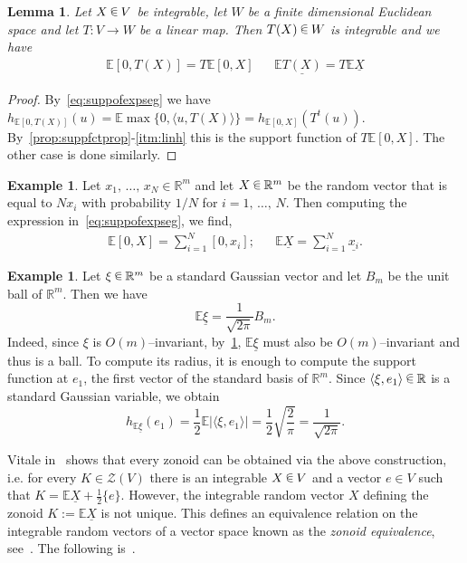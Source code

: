 \documentclass[10pt]{amsart}
\newtheorem{lemm}[theo]{Lemma}\newtheorem{prop}[theo]{Proposition}\newtheorem{coro}[theo]{Corollary}\newtheorem{conj}[theo]{Conjecture}
\theoremstyle{definition}\newtheorem{defi}[theo]{Definition}\newtheorem{rema}[theo]{Remark}\newtheorem{exam}[theo]{Example}\newtheorem{exem}[theo]{Example}\newtheorem{nota}[theo]{Notation}
\newcommand{\R}{\mathbb{R}}
\newcommand{\EE}{\mathbb{E}}
\newcommand{\ZZ}{\mathscr{Z}}
\newcommand{\seg}{\underline}
\newcommand*\randin{
\mathchoice {\raisebox{-.35ex}{$\displaystyle{^\subset}$}\mkern-11.5mu\raisebox{+.45ex}{$\displaystyle{_\subset}$}} {\mkern+1mu\raisebox{-.27ex}{$\textstyle{^\subset}$}\mkern-11.7mu\raisebox{+.45ex}{$\textstyle{_\subset}$}} {\raisebox{.35ex}{$\scriptstyle\subset$}\mkern-14mu\raisebox{-.15ex}{$\scriptstyle\subset$}} {\raisebox{.3ex}{$\scriptscriptstyle\subset$}\mkern-13.5mu\raisebox{-.10ex}{$\scriptscriptstyle\subset$}}}
\begin{document}
\begin{lemm}\label{lem:lineartransfofVitale}
Let $X\,\randin\, V$ be integrable, let $W$ be a finite dimensional Euclidean space and let $T:V\to W$ be a linear map. Then $T(X)\,\randin\, W$ is integrable and we have
\begin{align*}
\EE[0,T(X)]=T\EE[0,X] && \EE\seg{T(X)}=T\EE\seg{X}
\end{align*}
\end{lemm}

\begin{proof}
By~\eqref{eq:suppofexpseg} we have $ h_{\EE[0,T(X)]}(u)=\EE\max\{0,\langle u, T(X)\rangle\}=h_{\EE[0,X]}(T^t(u))$. By~\cref{prop:suppfctprop}-\ref{itm:linh} this is the support function of $T\EE[0,X].$ The other case is done similarly.
\end{proof}

\begin{exam}
Let $x_1,\,\ldots,\,x_N\in\R^m$ and let $X\,\randin\, \R^m$ be the random vector that is equal to $Nx_i$ with probability $1/N$ for $i=1,\,\ldots,\,N$. Then computing the expression in~\eqref{eq:suppofexpseg}, we find,
\begin{align*}
\EE[0,X]=\sum_{i=1}^N[0,x_i]; && \EE\seg{X}=\sum_{i=1}^N\seg{x_i}.
\end{align*}
\end{exam}

\begin{exam}\label{eg:gausszonisball}
Let $\xi\,\randin\,\R^m$ be a standard Gaussian vector and let $B_m$ be the unit ball of $\R^m$. Then we have
\begin{equation*}
\EE\seg{\xi}=\frac{1}{\sqrt{2\pi}}B_m.
\end{equation*}
Indeed, since $\xi$ is $O(m)$--invariant, by~\cref{lem:lineartransfofVitale}, $\EE\seg{\xi}$ must also be $O(m)$--invariant and thus is a ball. To compute its radius, it is enough to compute the support function at $e_1$, the first vector of the standard basis of $\R^m$. Since $\langle \xi, e_1\rangle\,\randin\,\R$ is a standard Gaussian variable, we obtain
\begin{equation*}
h_{\EE\seg{\xi}}(e_1)=\frac{1}{2}\EE|\langle \xi, e_1\rangle|=\frac{1}{2}\sqrt{\frac{2}{\pi}}=\frac{1}{\sqrt{2\pi}}.
\end{equation*}
\end{exam}

Vitale in~\cite[Theorem~3.1]{Vitale} shows that every zonoid can be obtained via the above construction, i.e. for every $K\in\ZZ(V)$ there is an integrable $X\,\randin\, V$ and a vector $e\in V$ such that $K=\EE\seg{X}+\tfrac{1}{2}\{e\}$. However, the integrable random vector $X$ defining the zonoid $K:=\EE\seg{X}$ is not unique. This defines an equivalence relation on the integrable random vectors of a vector space known as the \emph{zonoid equivalence}, see~\cite{MSSzoneq}. The following is~\cite[Corollary~3]{MSSzoneq}.
\end{document}
